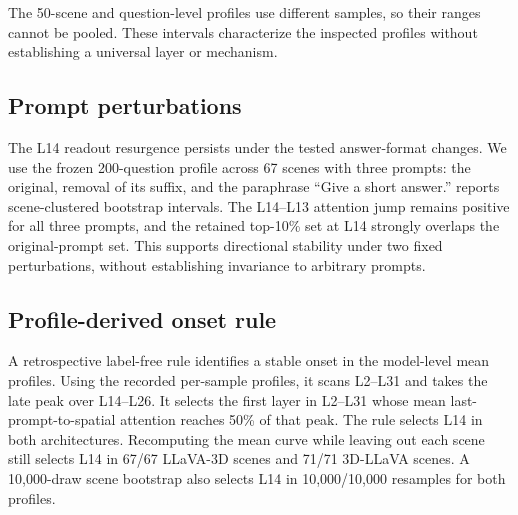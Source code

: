 The 50-scene and question-level profiles use different samples, so their ranges cannot be pooled. These intervals characterize the inspected profiles without establishing a universal layer or mechanism.

\subsection{Prompt perturbations}
The L14 readout resurgence persists under the tested answer-format changes. We use the frozen 200-question profile across 67 scenes with three prompts: the original, removal of its suffix, and the paraphrase ``Give a short answer.''  reports scene-clustered bootstrap intervals. The L14--L13 attention jump remains positive for all three prompts, and the retained top-10\% set at L14 strongly overlaps the original-prompt set. This supports directional stability under two fixed perturbations, without establishing invariance to arbitrary prompts.

\begin{table}[t]
\centering
\caption{Prompt perturbation of the L14 readout profile.}
\label{tab:supp_prompt}
\end{table}

\subsection{Profile-derived onset rule}
A retrospective label-free rule identifies a stable onset in the model-level mean profiles. Using the recorded per-sample profiles, it scans L2--L31 and takes the late peak over L14--L26. It selects the first layer in L2--L31 whose mean last-prompt-to-spatial attention reaches 50\% of that peak. The rule selects L14 in both architectures. Recomputing the mean curve while leaving out each scene still selects L14 in 67/67 LLaVA-3D scenes and 71/71 3D-LLaVA scenes. A 10,000-draw scene bootstrap also selects L14 in 10,000/10,000 resamples for both profiles.

